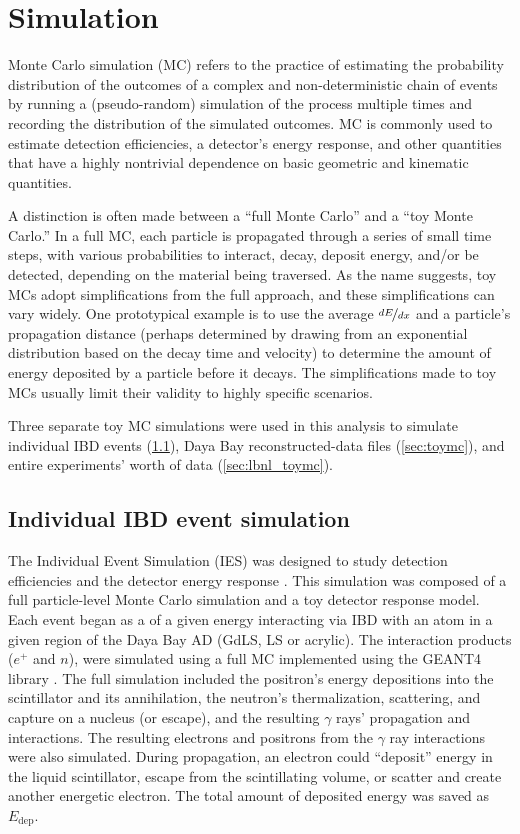 \chapter{Simulation}
\label{ch:simulation}

Monte Carlo simulation (MC) refers to the practice
of estimating the probability distribution of the outcomes
of a complex and non-deterministic chain of events
by running a (pseudo-random) simulation of the process multiple times
and recording the distribution of the simulated outcomes.
MC is commonly used to estimate detection efficiencies,
a detector's energy response,
and other quantities that have a highly nontrivial dependence
on basic geometric and kinematic quantities.

A distinction is often made between a ``full Monte Carlo''
and a ``toy Monte Carlo.''
In a full MC, each particle is propagated through a series of small time steps,
with various probabilities to interact, decay, deposit energy, and/or be detected,
depending on the material being traversed.
As the name suggests, toy MCs adopt simplifications from the full approach,
and these simplifications can vary widely.
One prototypical example is to use the average $\nicefrac{dE}{dx}$
and a particle's propagation distance
(perhaps determined by drawing from an exponential distribution
based on the decay time and velocity)
to determine the amount of energy deposited by a particle
before it decays.
The simplifications made to toy MCs usually limit their validity
to highly specific scenarios.

Three separate toy MC simulations were used in this analysis
to simulate individual IBD events (\cref{sec:thu_toymc}),
Daya Bay reconstructed-data files (\cref{sec:toymc}),
and entire experiments' worth of data (\cref{sec:lbnl_toymc}).

\section{Individual IBD event simulation}
\label{sec:thu_toymc}

The Individual Event Simulation (IES) was designed
to study detection efficiencies and the detector energy response \cite{nh2016technote}.
This simulation was composed of a full particle-level Monte Carlo simulation
and a toy detector response model.
Each event began as a \nuebar{} of a given energy interacting via IBD
with an atom in a given region of the Daya Bay AD
(GdLS, LS or acrylic).
The interaction products ($e^+$ and $n$),
were simulated using a full MC implemented using the GEANT4 library \cite{geant4}.
The full simulation included
the positron's energy depositions into the scintillator
and its annihilation,
the neutron's thermalization, scattering, and capture on a nucleus (or escape),
and the resulting $\gamma$ rays' propagation and interactions.
The resulting electrons and positrons from the $\gamma$ ray interactions
were also simulated.
During propagation, an electron could
``deposit'' energy in the liquid scintillator,
escape from the scintillating volume,
or scatter and create another energetic electron.
The total amount of deposited energy was saved as $E_{\text{dep}}$.

